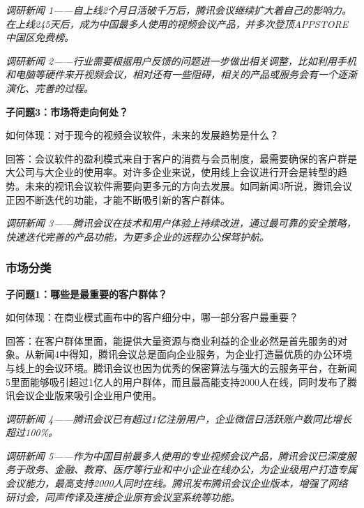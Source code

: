 \documentclass[a4paper,12pt]{article}
\begin{document}
    \textit{调研新闻 1——⾃上线2个⽉⽇活破千万后，腾讯会议继续扩⼤着⾃⼰的影响⼒。在上线245天后，成为中国最多⼈使⽤的视频会议产品，并多次登顶APPSTORE中国区免费榜。}
    

    \textit{调研新闻 2——⾏业需要根据⽤户反馈的问题进⼀步做出相关调整，⽐如利⽤⼿机和电脑等硬件来开视频会议，相对还有⼀些阻碍，相关的产品或服务会有⼀个逐渐演化、完善的过程。}
    

    
    \textbf{子问题3：市场将走向何处？}

    如何体现：对于现今的视频会议软件，未来的发展趋势是什么？

    回答：会议软件的盈利模式来⾃于客户的消费与会员制度，最需要确保的客户群是⼤公司与⼤企业的使⽤率。对许多企业来说，使⽤线上会议进⾏开会是转型的趋势。未来的视讯会议软件需要向更多元的⽅向去发展。如同新闻3所说，腾讯会议正因不断迭代的功能，才能不断吸引新的客户群体。

    \textit{调研新闻 3——腾讯会议在技术和⽤户体验上持续改进，通过最可靠的安全策略，快速迭代完善的产品功能，为更多企业的远程办公保驾护航。}

    
    \subsubsection{市场分类}
    \textbf{子问题1：哪些是最重要的客户群体？}

    如何体现：在商业模式画布中的客户细分中，哪⼀部分客户最重要？

    回答：在客户群体⾥⾯，能提供⼤量资源与商业利益的企业必然是⾸先服务的对象。从新闻4中得知，腾讯会议总是⾯向企业服务，为企业打造最优质的办公环境与线上的会议环境。腾讯会议也因为优秀的保密算法与强⼤的云服务平台，在新闻5⾥⾯能够吸引超过1亿⼈的⽤户群体，⽽且最⾼能⽀持2000⼈在线，同时发布了腾讯会议企业版来吸引企业用户使用。

    \textit{调研新闻 4——腾讯会议已有超过1亿注册⽤户，企业微信⽇活跃账户数同⽐增⻓超过100\%。}


    \textit{调研新闻 5——作为中国⽬前最多⼈使⽤的专业视频会议产品，腾讯会议已深度服务于政务、⾦融、教育、医疗等⾏业和中⼩企业在线办公，为企业级⽤户打造专属会议能⼒，最⾼⽀持2000⼈同时在线。腾讯发布腾讯会议企业版本，增强了⽹络研讨会，同声传译及连接企业原有会议室系统等功能。}
\end{document}
